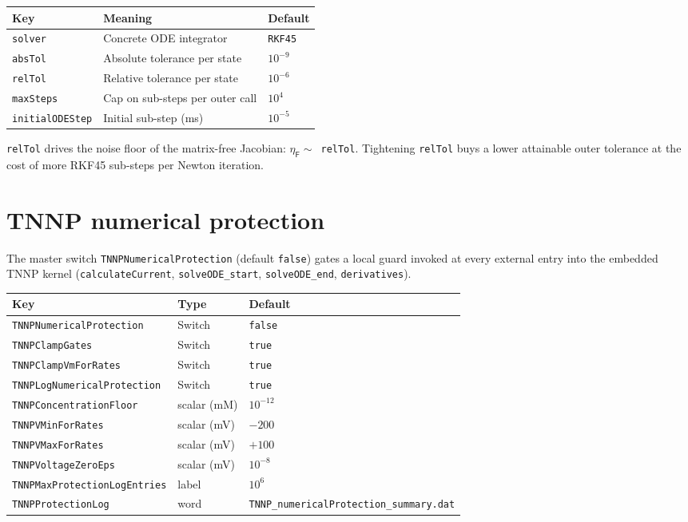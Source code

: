 \documentclass[11pt,a4paper]{article}
\newcommand{\code}[1]{\texttt{\small #1}}
\newcommand{\Fres}{\mathsf{F}}
\begin{document}
\begin{center}
\begin{tabular}{@{}lll@{}}
\toprule
Key & Meaning & Default \\
\midrule
\code{solver} & Concrete ODE integrator & \code{RKF45} \\
\code{absTol} & Absolute tolerance per state & $10^{-9}$ \\
\code{relTol} & Relative tolerance per state & $10^{-6}$ \\
\code{maxSteps} & Cap on sub-steps per outer call & $10^{4}$ \\
\code{initialODEStep} & Initial sub-step (ms) & $10^{-5}$ \\
\bottomrule
\end{tabular}
\end{center}

\code{relTol} drives the noise floor of the matrix-free Jacobian:
$\eta_{\Fres} \sim $~\code{relTol}. Tightening \code{relTol} buys
a lower attainable outer tolerance at the cost of more RKF45 sub-steps
per Newton iteration.

\section{TNNP numerical protection}

The master switch \code{TNNPNumericalProtection} (default \code{false})
gates a local guard invoked at every external entry into the embedded TNNP
kernel (\code{calculateCurrent}, \code{solveODE\_start},
\code{solveODE\_end}, \code{derivatives}).

\begin{center}
\begin{tabular}{@{}lll@{}}
\toprule
Key & Type & Default \\
\midrule
\code{TNNPNumericalProtection} & Switch & \code{false} \\
\code{TNNPClampGates} & Switch & \code{true} \\
\code{TNNPClampVmForRates} & Switch & \code{true} \\
\code{TNNPLogNumericalProtection} & Switch & \code{true} \\
\code{TNNPConcentrationFloor} & scalar (mM) & $10^{-12}$ \\
\code{TNNPVMinForRates} & scalar (mV) & $-200$ \\
\code{TNNPVMaxForRates} & scalar (mV) & $+100$ \\
\code{TNNPVoltageZeroEps} & scalar (mV) & $10^{-8}$ \\
\code{TNNPMaxProtectionLogEntries} & label & $10^{6}$ \\
\code{TNNPProtectionLog} & word & \code{TNNP\_numericalProtection\_summary.dat} \\
\bottomrule
\end{tabular}
\end{center}
\end{document}
